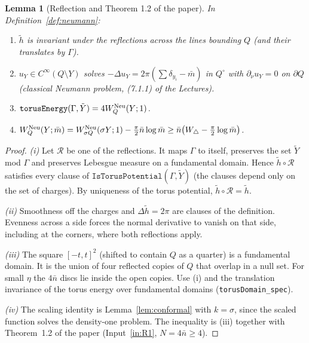 \documentclass[11pt]{article}
\newtheorem{lemma}[theorem]{Lemma}
\theoremstyle{definition}
\theoremstyle{remark}
\newcommand{\Wtri}{W_{\triangle}}
\newcommand{\lean}[1]{\texttt{#1}}
\begin{document}
\begin{lemma}[Reflection and Theorem 1.2 of the paper]\label{lem:reflection}
In Definition~\ref{def:neumann}:
\begin{enumerate}[label=(\roman*)]
\item $\tilde h$ is invariant under the reflections across the lines bounding $Q$ (and their
  translates by $\Gamma$).
\item $u_Y\in C^\infty(Q\setminus Y)$ solves $-\Delta u_Y=2\pi(\sum\delta_{y_i}-\bar m)$ in $Q^\circ$
  with $\partial_\nu u_Y=0$ on $\partial Q$ (classical Neumann problem, (7.1.1) of the Lectures).
\item $\mathtt{torusEnergy}(\Gamma,\tilde Y)=4W^{\rm Neu}_Q(Y;1)$.
\item $W^{\rm Neu}_Q(Y;\bar m)=W^{\rm Neu}_{\sigma Q}(\sigma Y;1)-\frac\pi2\bar n\log\bar m\ge\bar n\bigl(\Wtri-\frac\pi2\log\bar m\bigr)$.
\end{enumerate}
\end{lemma}
\begin{proof}
\emph{(i)} Let $\mathcal R$ be one of the reflections. It maps $\Gamma$ to itself, preserves
the set $\tilde Y$ mod $\Gamma$ and preserves Lebesgue measure on a fundamental domain. Hence
$\tilde h\circ\mathcal R$ satisfies every clause of $\mathtt{IsTorusPotential}(\Gamma,\tilde Y)$
(the clauses depend only on the set of charges). By uniqueness of the torus potential,
$\tilde h\circ\mathcal R=\tilde h$.

\emph{(ii)} Smoothness off the charges and $\Delta\tilde h=2\pi$ are clauses of the definition.
Evenness across a side forces the normal derivative to vanish on that side, including at the
corners, where both reflections apply.

\emph{(iii)} The square $[-t,t]^2$ (shifted to contain $Q$ as a quarter) is a fundamental domain.
It is the union of four reflected copies of $Q$ that overlap in a null set. For small $\eta$ the
$4\bar n$ discs lie inside the open copies. Use (i) and the translation invariance of the torus
energy over fundamental domains (\lean{torusDomain\_spec}).

\emph{(iv)} The scaling identity is Lemma~\ref{lem:conformal} with $k=\sigma$, since the scaled
function solves the density-one problem. The inequality is (iii) together with Theorem~1.2 of the paper
(Input~\ref{in:R1}, $N=4\bar n\ge4$).
\end{proof}
\end{document}
